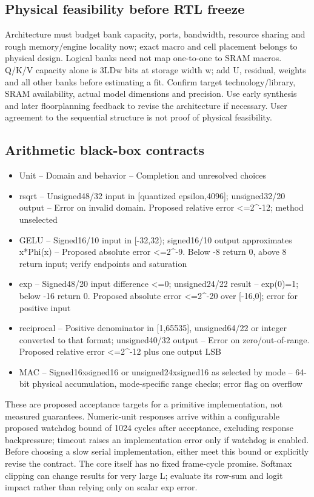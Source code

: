 \documentclass[11pt,a4paper]{article}
\begin{document}
\subsection{Physical feasibility before RTL freeze}

Architecture must budget bank capacity, ports, bandwidth, resource sharing and rough memory/engine locality now; exact macro and cell placement belongs to physical design. Logical banks need not map one-to-one to SRAM macros. Q/K/V capacity alone is 3LDw bits at storage width w; add U, residual, weights and all other banks before estimating a fit. Confirm target technology/library, SRAM availability, actual model dimensions and precision. Use early synthesis and later floorplanning feedback to revise the architecture if necessary. User agreement to the sequential structure is not proof of physical feasibility.

\subsection{Arithmetic black-box contracts}

\begin{itemize}
\item Unit -- Domain and behavior -- Completion and unresolved choices
\item rsqrt -- Unsigned48/32 input in [quantized epsilon,4096]; unsigned32/20 output -- Error on invalid domain. Proposed relative error <=2\textasciicircum{}-12; method unselected
\item GELU -- Signed16/10 input in [-32,32); signed16/10 output approximates x*Phi(x) -- Proposed absolute error <=2\textasciicircum{}-9. Below -8 return 0, above 8 return input; verify endpoints and saturation
\item exp -- Signed48/20 input difference <=0; unsigned24/22 result -- exp(0)=1; below -16 return 0. Proposed absolute error <=2\textasciicircum{}-20 over [-16,0]; error for positive input
\item reciprocal -- Positive denominator in [1,65535], unsigned64/22 or integer converted to that format; unsigned40/32 output -- Error on zero/out-of-range. Proposed relative error <=2\textasciicircum{}-12 plus one output LSB
\item MAC -- Signed16xsigned16 or unsigned24xsigned16 as selected by mode -- 64-bit physical accumulation, mode-specific range checks; error flag on overflow
\end{itemize}


These are proposed acceptance targets for a primitive implementation, not measured guarantees. Numeric-unit responses arrive within a configurable proposed watchdog bound of 1024 cycles after acceptance, excluding response backpressure; timeout raises an implementation error only if watchdog is enabled. Before choosing a slow serial implementation, either meet this bound or explicitly revise the contract. The core itself has no fixed frame-cycle promise. Softmax clipping can change results for very large L; evaluate its row-sum and logit impact rather than relying only on scalar exp error.
\end{document}
